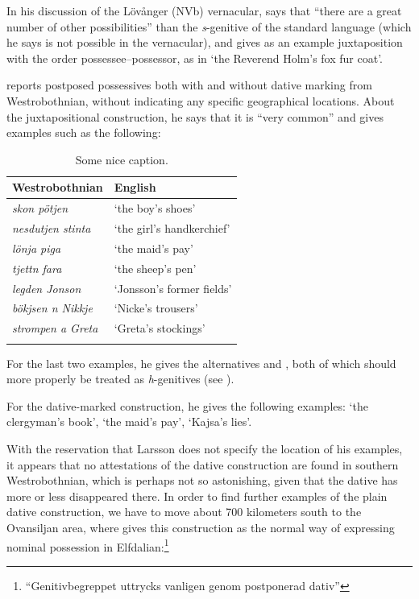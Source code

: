 {In his discussion of the Lövånger (NVb) vernacular, \citet[208]{Holm1942} says that “there are a great number of other possibilities” than the \textit{s}{}-genitive of the standard language (which he says is not possible in the vernacular), and gives as an example juxtaposition with the order possessee–possessor, as in  ‘the Reverend Holm’s fox fur coat’. 

\citet[125]{Larsson1929} reports postposed possessives both with and without dative marking from Westrobothnian, without indicating any specific geographical locations. About the juxtapositional construction, he says that it is “very common” and gives examples such as the following:

\begin{table}
\begin{tabular}{ll}
\lsptoprule Westrobothnian & English \\
\midrule 
\textit{skon pötjen} & ‘the boy’s shoes’\\ 
\textit{nesdutjen stinta} & ‘the girl’s handkerchief’\\ 
\textit{lönja piga} & ‘the maid’s pay’\\ 
\textit{tjettn fara} & ‘the sheep’s pen’\\ 
\textit{legden Jonson} & ‘Jonsson’s former fields’\\ 
\textit{bökjsen n Nikkje} & ‘Nicke’s trousers’\\ 
\textit{strompen a Greta} & ‘Greta’s stockings’\\
\lspbottomrule
\end{tabular}
\caption{Some nice caption.}
\label{tab:5.1}
\end{table} 


For the last two examples, he gives the alternatives  and , both of which should more properly be treated as \textit{h}{}-genitives (see ).

For the dative-marked construction, he gives the following examples:  ‘the clergyman’s book’,  ‘the maid’s pay’, ‘Kajsa’s lies’. 

With the reservation that Larsson does not specify the location of his examples, it appears that no attestations of the dative construction are found in southern Westrobothnian, which is perhaps not so astonishing, given that the dative has more or less disappeared there. In order to find further examples of the plain dative construction, we have to move about 700 kilometers south to the Ovansiljan area, where \citet[97]{Levander1909} gives this construction as the normal way of expressing nominal possession in Elfdalian:\footnote{ “Genitivbegreppet uttrycks vanligen genom postponerad dativ”}

}
